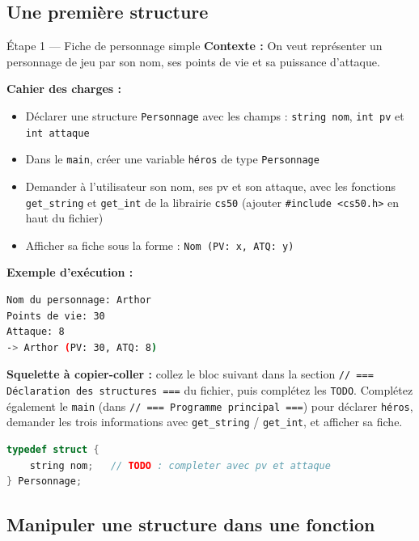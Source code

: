 \subsection{Une première structure}

\begin{UPSTIManipulation}{Étape 1 — Fiche de personnage simple}
  \textbf{Contexte :} On veut représenter un personnage de jeu par son nom, ses points de vie
  et sa puissance d'attaque.

  \textbf{Cahier des charges :}
  \begin{itemize}
    \item Déclarer une structure \texttt{Personnage} avec les champs : \texttt{string nom},
      \texttt{int pv} et \texttt{int attaque}
    \item Dans le \texttt{main}, créer une variable \texttt{héros} de type \texttt{Personnage}
    \item Demander à l'utilisateur son nom, ses pv et son attaque, avec les fonctions
      \texttt{get\_string} et \texttt{get\_int} de la librairie \texttt{cs50} (ajouter
      \texttt{\#include <cs50.h>} en haut du fichier)
    \item Afficher sa fiche sous la forme : \texttt{Nom (PV: x, ATQ: y)}
  \end{itemize}

  \textbf{Exemple d'exécution :}
  \begin{lstlisting}[language=bash]
Nom du personnage: Arthor
Points de vie: 30
Attaque: 8
-> Arthor (PV: 30, ATQ: 8)
  \end{lstlisting}

  \textbf{Squelette à copier-coller :} collez le bloc suivant dans la section
  \texttt{// === Déclaration des structures ===} du fichier, puis complétez les \texttt{TODO}.
  Complétez également le \texttt{main} (dans \texttt{// === Programme principal ===}) pour
  déclarer \texttt{héros}, demander les trois informations avec \texttt{get\_string} /
  \texttt{get\_int}, et afficher sa fiche.

  \begin{lstlisting}[language=C]
typedef struct {
    string nom;   // TODO : completer avec pv et attaque
} Personnage;
  \end{lstlisting}

\end{UPSTIManipulation}

\subsection{Manipuler une structure dans une fonction}

